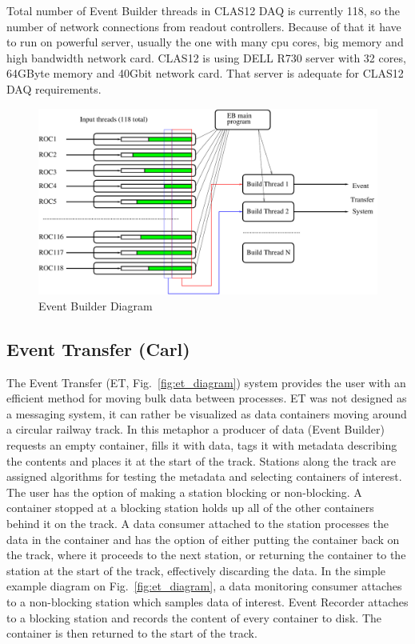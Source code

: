 Total number of Event Builder threads in CLAS12 DAQ is currently 118, so the number of network connections from readout controllers. Because of that it have to run on powerful server, usually the one with many cpu cores, big memory and high bandwidth network card. CLAS12 is using DELL R730 server with 32 cores, 64GByte memory and 40Gbit network card. That server is adequate for CLAS12 DAQ requirements.

\begin{figure}[hbt]
	\centering
	\includegraphics[width=1.0\columnwidth,keepaspectratio]{img/eb_diagram.pdf}
	\caption{Event Builder Diagram}
	\label{fig:eb_diagram}
\end{figure}


\subsection{Event Transfer (Carl)}

The Event Transfer (ET, Fig.~\ref{fig:et_diagram}) system provides the user with an efficient method for moving bulk data between processes. ET was not designed as a messaging system, it can rather be visualized as data containers moving around a circular railway track. In this metaphor a producer of data (Event Builder) requests an empty container, fills it with data, tags it with metadata describing the contents and places it at the start of the track. Stations along the track are assigned algorithms for testing the metadata and selecting containers of interest. The user has the option of making a station blocking or non-blocking. A container stopped at a blocking station holds up all of the other containers behind it on the track. A data consumer attached to the station processes the data in the container and has the option of either putting the container back on the track, where it proceeds to the next station, or returning the container to the station at the start of the track, effectively discarding the data. In the simple example diagram on Fig.~\ref{fig:et_diagram}, a data monitoring consumer attaches to a non-blocking station which samples data of interest. Event Recorder attaches to a blocking station and records the content of every container to disk. The container is then returned to the start of the track.


